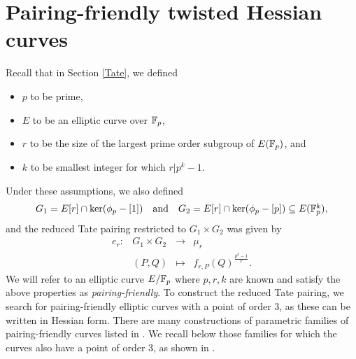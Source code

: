 \section{Pairing-friendly twisted Hessian curves}

Recall that in Section \ref{Tate}, we defined
\begin{itemize}
\item $p$ to be prime,
\item $E$ to be an elliptic curve over $\mathbb{F}_{p}$,
\item $r$ to be the size of the largest prime order subgroup of $E(\mathbb{F}_{p})$, and
\item $k$ to be smallest integer for which $r | p^{k}-1$.
\end{itemize}
Under these assumptions, we also defined 
\[\begin{array}{ccc}
G_{1} = E[r] \cap \ker(\phi_{p} - [1]) & \text{and} & G_{2} = E[r] \cap \ker(\phi_{p} - [p]) \subseteq E(\mathbb{F}_{p}^{k}),
\end{array}\]
and the reduced Tate pairing restricted to $G_{1} \times G_{2}$ was given by
\[\begin{array}{rccc}
e_{r}:& G_{1} \times G_{2} & \longrightarrow & \mu_{r} \\
& (P,Q) & \mapsto & f_{r,P}(Q)^{\frac{p^{k}-1}{r}}.
\end{array}\]
We will refer to an elliptic curve $E/\mathbb{F}_{p}$ where $p,r,k$ are known and satisfy the above properties as \emph{pairing-friendly}. To construct the reduced Tate pairing, we search for pairing-friendly elliptic curves with a point of order 3, as these can be written in Hessian form. There are many constructions of parametric families of pairing-friendly curves listed in \cite{2010/freeman}. We recall below those families for which the curves also have a point of order 3, as shown in \cite[Section 5]{2015/hessian}.



